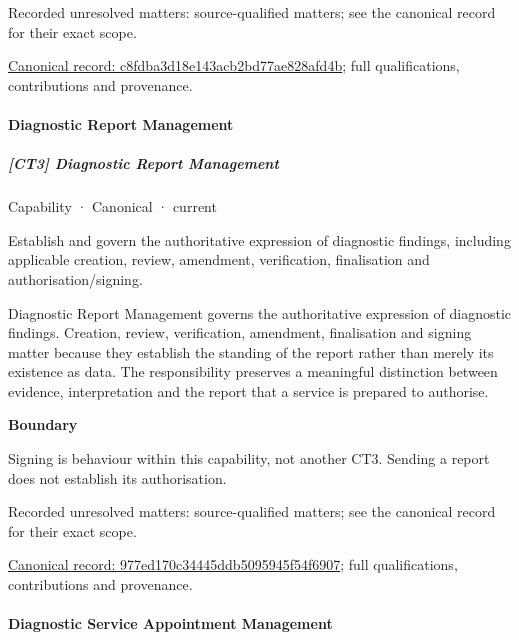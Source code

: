 {\small Recorded unresolved matters: source-qualified matters; see the canonical record for their exact scope.}\par
{\footnotesize \href{../../../../continuum/strategy/capability/c8fdba3d18e143acb2bd77ae828afd4b.md}{Canonical record: c8fdba3d18e143acb2bd77ae828afd4b}; full qualifications, contributions and provenance.}\par
\paragraph{Diagnostic Report Management}

\subparagraph{[CT3] Diagnostic Report Management}

\label{element:977ed170c34445ddb5095945f54f6907}
{\small Capability · Canonical · current}\par

Establish and govern the authoritative expression of diagnostic findings, including applicable creation, review, amendment, verification, finalisation and authorisation/signing.



Diagnostic Report Management governs the authoritative expression of diagnostic findings. Creation, review, verification, amendment, finalisation and signing matter because they establish the standing of the report rather than merely its existence as data. The responsibility preserves a meaningful distinction between evidence, interpretation and the report that a service is prepared to authorise.



\textbf{Boundary}



Signing is behaviour within this capability, not another CT3. Sending a report does not establish its authorisation.


{\small Recorded unresolved matters: source-qualified matters; see the canonical record for their exact scope.}\par
{\footnotesize \href{../../../../continuum/strategy/capability/977ed170c34445ddb5095945f54f6907.md}{Canonical record: 977ed170c34445ddb5095945f54f6907}; full qualifications, contributions and provenance.}\par
\paragraph{Diagnostic Service Appointment Management}

